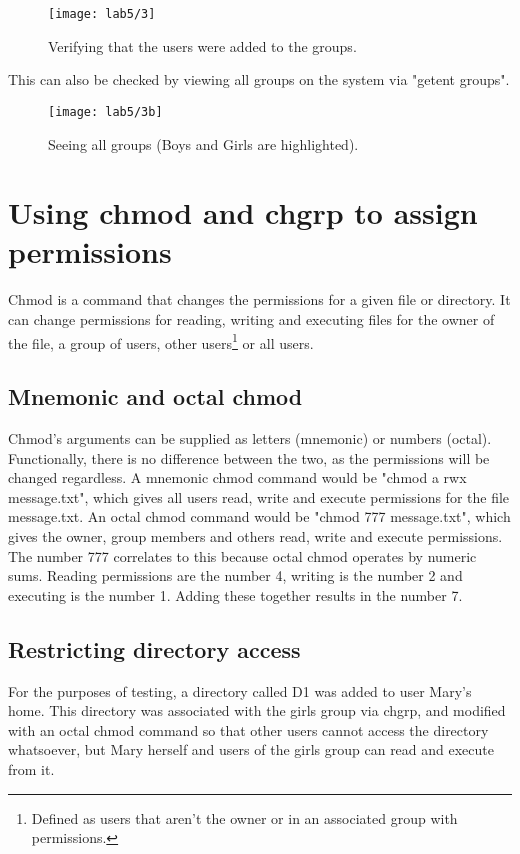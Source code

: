 \begin{figure}[H]
    \centering
    \texttt{[image: lab5/3]}
    \caption{Verifying that the users were added to the groups.}
    \label{fig:checkGroups}
\end{figure}

This can also be checked by viewing all groups on the system via "getent groups".

\begin{figure}[H]
    \centering
    \texttt{[image: lab5/3b]}
    \caption{Seeing all groups (Boys and Girls are highlighted).}
    \label{fig:getent}
\end{figure}

\pagebreak

\section{Using chmod and chgrp to assign permissions}\label{sec:using-chmod}
Chmod is a command that changes the permissions for a given file or directory.
It can change permissions for reading, writing and executing files for the owner of the file,
a group of users, other users\footnote{Defined as users that aren't the owner or in an
associated group with permissions.} or all users.

\subsection{Mnemonic and octal chmod}\label{subsec:mnemonic-and-octal-chmod}
Chmod's arguments can be supplied as letters (mnemonic) or numbers (octal).
Functionally, there is no difference between the two, as the permissions will be changed regardless.
A mnemonic chmod command would be "chmod a \+rwx message.txt", which gives all users read, write
and execute permissions for the file message.txt.
An octal chmod command would be "chmod 777 message.txt", which gives the owner, group members
and others read, write and execute permissions.
The number 777 correlates to this because octal chmod operates by numeric sums.
Reading permissions are the number 4, writing is the number 2 and executing is the number 1.
Adding these together results in the number 7.

\subsection{Restricting directory access}\label{subsec:chgrp}
For the purposes of testing, a directory called D1 was added to user Mary's home.
This directory was associated with the girls group via chgrp, and modified with an octal chmod
command so that other users cannot access the directory whatsoever, but Mary herself and users
of the girls group can read and execute from it.

